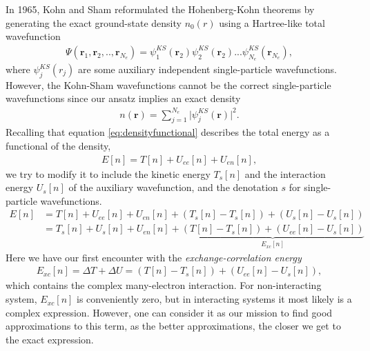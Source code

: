 In 1965, Kohn and Sham \cite{Kohn1965} reformulated the Hohenberg-Kohn theorems by generating the exact ground-state density $n_0(r)$ using a Hartree-like total wavefunction
\begin{align}
    \Psi(\boldsymbol{r}_1,\boldsymbol{r}_2,..,\boldsymbol{r}_{N_e}) = \psi_1^{KS}(\boldsymbol{r}_2)\psi_2^{KS}(\boldsymbol{r}_2)...\psi_{N_e}^{KS}(\boldsymbol{r}_{N_e}),
\end{align}
where $\psi_j^{KS}(r_j)$ are some auxiliary independent single-particle wavefunctions. However, the Kohn-Sham wavefunctions cannot be the correct single-particle wavefunctions since our ansatz implies an exact density
\begin{align}
  n(\boldsymbol{r}) = \sum_{j=1}^{N_e}\lvert \psi_j^{KS}(\boldsymbol{r})\rvert^2.
\end{align}
Recalling that equation \autoref{eq:densityfunctional} describes the total energy as a functional of the density,
\begin{align}
  E[n] = T[n] + U_{ee}[n] + U_{en}[n],
\end{align}
we try to modify it to include the kinetic energy $T_s[n]$ and the interaction energy $U_s[n]$ of the auxiliary wavefunction, and the denotation $s$ for single-particle wavefunctions.
\begin{align*}
  E[n] &= T[n] + U_{ee}[n] + U_{en}[n] + \left( T_s[n] - T_s[n] \right) + \left( U_s[n] - U_s[n] \right) \\
  &= T_s[n] + U_{s}[n] + U_{en}[n] + \underbrace{\left(T[n] - T_s[n] \right) + \left( U_{ee}[n] - U_s[n] \right)}_{E_{xc}[n]}
\end{align*}
Here we have our first encounter with the \textit{exchange-correlation energy}
\begin{align}
  E_{xc}[n] = \Delta T + \Delta U = \left(T[n] - T_s[n] \right) + \left( U_{ee}[n] - U_s[n] \right),
\end{align}
which contains the complex many-electron interaction. For non-interacting system, $E_{xc}[n]$ is conveniently zero, but in interacting systems it most likely is a complex expression. However, one can consider it as our mission to find good approximations to this term, as the better approximations, the closer we get to the exact expression.

